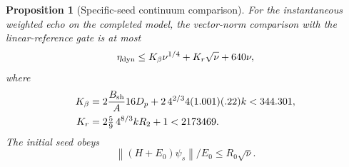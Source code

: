 \documentclass[11pt]{article}
\newtheorem{proposition}[theorem]{Proposition}
\newcommand{\norm}[1]{\left\lVert#1\right\rVert}
\begin{document}
\begin{proposition}[Specific-seed continuum comparison]\label{prop:nonlinear}
For the instantaneous weighted echo on the completed model, the vector-norm comparison with the linear-reference gate is at most
\begin{equation}
 \eta_{\rm dyn}\le K_\beta\nu^{1/4}+K_r\sqrt\nu+640\nu,\label{eq:dyn}
\end{equation}
where
\begin{align}
 K_\beta&=2\frac{B_{\rm sh}}A16D_p
  +2\,4^{2/3}4(1.001)(.22)k<344.301,\label{eq:Kbeta}\\
 K_r&=2\tfrac59\,4^{8/3}kR_2+1<2173469.\label{eq:Kr}
\end{align}
The initial seed obeys
\begin{equation}
 \norm{(H+E_0)\psi_s}/E_0\le R_0\sqrt\nu.\label{eq:seedgraph}
\end{equation}
\end{proposition}
\end{document}
